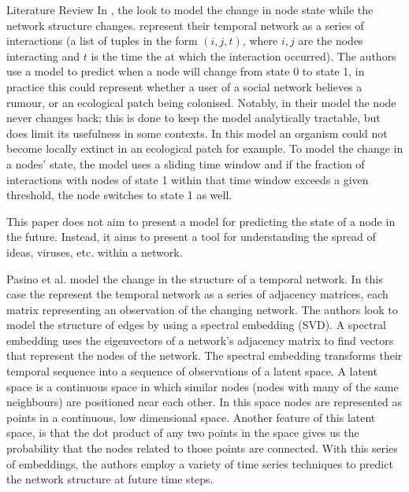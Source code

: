 \documentclass[12pt]{amsart}
\begin{document}
\begin{section}{Literature Review}
        In \cite{KARIMI20133476}, the  look to model the change in node state while the network structure changes.  represent their temporal network as a series of interactions (a list of tuples in the form $(i,j,t)$, where $i,j$ are the nodes interacting and $t$ is the time the at which the interaction occurred). The authors use a model to predict when a node will change from state 0 to state 1, in practice this could represent whether a user of a social network believes a rumour, or an ecological patch being colonised. Notably, in their model the node never changes back; this is done to keep the model analytically tractable, but does limit its usefulness in some contexts. In this model an organism could not become locally extinct in an ecological patch for example. To model the change in a nodes' state, the model uses a sliding time window and if the fraction of interactions with nodes of state 1 within that time window exceeds a given threshold, the node switches to state 1 as well. 

        This paper does not aim to present a model for predicting the state of a node in the future. Instead, it aims to present a tool for understanding the spread of ideas, viruses, etc. within a network.


        Pasino et al.\cite{sanna2021link} model the change in the structure of a temporal network. In this case the  represent the temporal network as a series of adjacency matrices, each matrix representing an observation of the changing network. The authors look to model the structure of edges by using a spectral embedding (SVD). A spectral embedding uses the eigenvectors of a network's adjacency matrix to find vectors that represent the nodes of the network. The spectral embedding transforms their temporal sequence into a sequence of observations of a latent space. A latent space is a continuous space in which similar nodes (nodes with many of the same neighbours) are positioned near each other. In this space nodes are represented as points in a continuous, low dimensional space. Another feature of this latent space, is that the dot product of any two points in the space gives us the probability that the nodes related to those points are connected.  With this series of embeddings, the authors employ a variety of time series techniques to predict the network structure at future time steps.


\end{section}
\end{document}
